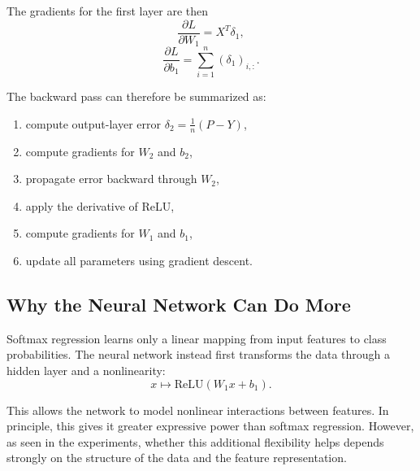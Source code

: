\documentclass[11pt]{article}
\begin{document}
The gradients for the first layer are then
\[
\frac{\partial L}{\partial W_1}
=
X^T \delta_1,
\]
\[
\frac{\partial L}{\partial b_1}
=
\sum_{i=1}^{n} (\delta_1)_{i,:}.
\]

The backward pass can therefore be summarized as:
\begin{enumerate}
    \item compute output-layer error $\delta_2 = \frac{1}{n}(P-Y)$,
    \item compute gradients for $W_2$ and $b_2$,
    \item propagate error backward through $W_2$,
    \item apply the derivative of ReLU,
    \item compute gradients for $W_1$ and $b_1$,
    \item update all parameters using gradient descent.
\end{enumerate}

\subsection*{Why the Neural Network Can Do More}

Softmax regression learns only a linear mapping from input features to class probabilities. The neural network instead first transforms the data through a hidden layer and a nonlinearity:
\[
x \mapsto \mathrm{ReLU}(W_1x + b_1).
\]

This allows the network to model nonlinear interactions between features. In principle, this gives it greater expressive power than softmax regression. However, as seen in the experiments, whether this additional flexibility helps depends strongly on the structure of the data and the feature representation.
\end{document}
